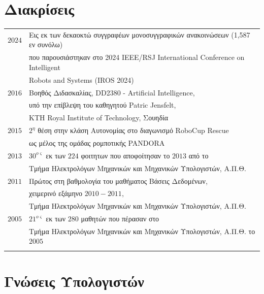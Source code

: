\documentclass[a4paper,10pt,twoside]{article}
\begin{document}
\section{Διακρίσεις}
\begin{tabular}{rl}

$2024$ & Εις εκ των δεκαοκτώ συγγραφέων μονοσυγγραφικών ανακοινώσεων (1,587 εν συνόλω) \\ & που παρουσιάστηκαν στο
         2024 IEEE/RSJ International Conference on Intelligent \\& Robots and Systems (IROS 2024) \\
$2016$ & Βοηθός Διδασκαλίας, DD2380 - Artificial Intelligence, \\ & υπό την επίβλεψη του καθηγητού Patric Jensfelt, \\ & KTH Royal Institute of Technology, Σουηδία\\
$2015$ & $2^{\eta}$ θέση στην κλάση Αυτονομίας στο διαγωνισμό RoboCup Rescue \\ & ως μέλος της ομάδας ρομποτικής PANDORA \\
$2013$ & $30^{o\varsigma}$ εκ των $224$ φοιτητων που αποφοίτησαν το $2013$ από το \\ & Tμήμα Ηλεκτρολόγων Μηχανικών και Μηχανικών Υπολογιστών, Α.Π.Θ. \\
$2011$ & Πρώτος στη βαθμολογία του μαθήματος Βάσεις Δεδομένων, \\ &χειμερινό εξάμηνο $2010 - 2011$, \\ &Tμήμα Ηλεκτρολόγων Μηχανικών και Μηχανικών Υπολογιστών, Α.Π.Θ. \\
$2005$ & $21^{o\varsigma}$ εκ των $280$ μαθητών που πέρασαν στο \\ &Tμήμα Ηλεκτρολόγων Μηχανικών και Μηχανικών Υπολογιστών, Α.Π.Θ. το $2005$\\
&\\
\end{tabular}

\section{Γνώσεις Υπολογιστών}
\end{document}
